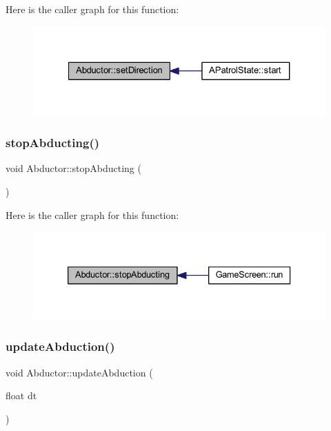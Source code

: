 Here is the caller graph for this function\+:
\nopagebreak
\begin{figure}[H]
\begin{center}
\leavevmode
\includegraphics[width=327pt]{class_abductor_aad7a615477ffe510984c8df16e98c903_icgraph}
\end{center}
\end{figure}
\mbox{\label{class_abductor_ac30f2067a89f27befe9651cae8b5bca6}} 
\subsubsection{\texorpdfstring{stop\+Abducting()}{stopAbducting()}}
{\footnotesize\ttfamily void Abductor\+::stop\+Abducting (\begin{DoxyParamCaption}{ }\end{DoxyParamCaption})}

Here is the caller graph for this function\+:
\nopagebreak
\begin{figure}[H]
\begin{center}
\leavevmode
\includegraphics[width=333pt]{class_abductor_ac30f2067a89f27befe9651cae8b5bca6_icgraph}
\end{center}
\end{figure}
\mbox{\label{class_abductor_aa9e1628fe605674f599b1ff535c31ac1}} 
\subsubsection{\texorpdfstring{update\+Abduction()}{updateAbduction()}}
{\footnotesize\ttfamily void Abductor\+::update\+Abduction (\begin{DoxyParamCaption}\item[{float}]{dt }\end{DoxyParamCaption})}

